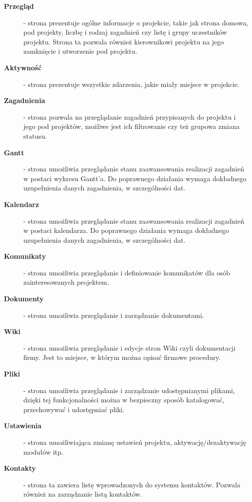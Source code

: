 		\begin{description}
			\item[\textbf{Przegląd}] - strona prezentuje ogólne informacje o projekcie, takie jak strona domowa, pod projekty, liczbę i rodzaj zagadnień czy listę i grupy uczestników projektu. Strona ta pozwala również kierownikowi projektu na jego zamknięcie i utworzenie pod projektu.
	
			\item[\textbf{Aktywność}] - strona prezentuje wszystkie zdarzenia, jakie miały miejsce w projekcie.
	
			\item[\textbf{Zagadnienia}] - strona pozwala na przeglądanie zagadnień przypisanych do projektu i jego pod projektów, możliwe jest ich filtrowanie czy też grupowa zmiana statusu.
	
			\item[\textbf{Gantt}] - strona umożliwia przeglądanie stanu zaawansowania realizacji zagadnień w postaci wykresu Gantt'a. Do poprawnego działania wymaga dokładnego uzupełnienia danych zagadnienia, w szczególności dat.
	
			\item[\textbf{Kalendarz}] - strona umożliwia przeglądanie stanu zaawansowania realizacji zagadnień w postaci kalendarza. Do poprawnego działania wymaga dokładnego uzupełnienia danych zagadnienia, w szczególności dat.
	
			\item[\textbf{Komunikaty}] - strona umożliwia przeglądanie i definiowanie komunikatów dla osób zainteresowanych projektem.
	
			\item[\textbf{Dokumenty}] - strona umożliwia przeglądanie i zarządzanie dokumentami.
	
			\item[\textbf{Wiki}] - strona umożliwia przeglądanie i edycje stron Wiki czyli dokumentacji firmy. Jest to miejsce, w którym można opisać firmowe procedury.
	
			\item[\textbf{Pliki}] - strona umożliwia przeglądanie i zarządzanie udostępnianymi plikami, dzięki tej funkcjonalności można w bezpieczny sposób katalogować, przechowywać i udostępniać pliki. 
	
			\item[\textbf{Ustawienia}] - strona umożliwiająca zmianę ustawień projektu, aktywację/dezaktywację modułów itp.
						
			\item[\textbf{Kontakty}] - strona ta zawiera listę wprowadzonych do systemu kontaktów. Pozwala również na zarządzanie listą kontaktów.


\end{description}
